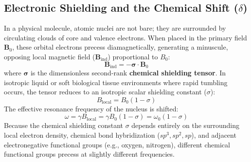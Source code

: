 \documentclass[11pt,a4paper]{article}
\begin{document}
\subsection{Electronic Shielding and the Chemical Shift (\texorpdfstring{$\delta$}{delta})}
In a physical molecule, atomic nuclei are not bare; they are surrounded by circulating clouds of core and valence electrons. When placed in the primary field $\mathbf{B}_0$, these orbital electrons precess diamagnetically, generating a minuscule, opposing local magnetic field ($\mathbf{B}_{\text{ind}}$) proportional to $B_0$:
\begin{equation}
    \mathbf{B}_{\text{ind}} = -\boldsymbol{\sigma} \cdot \mathbf{B}_0
\end{equation}
where $\boldsymbol{\sigma}$ is the dimensionless second-rank \textbf{chemical shielding tensor}. In isotropic liquid or soft biological tissue environments where rapid tumbling occurs, the tensor reduces to an isotropic scalar shielding constant ($\sigma$):
\begin{equation}
    B_{\text{local}} = B_0 (1 - \sigma)
\end{equation}
The effective resonance frequency of the nucleus is shifted:
\begin{equation}
    \omega = \gamma B_{\text{local}} = \gamma B_0 (1 - \sigma) = \omega_0 (1 - \sigma)
\end{equation}
Because the chemical shielding constant $\sigma$ depends entirely on the surrounding local electron density, chemical bond hybridization ($sp^3, sp^2, sp$), and adjacent electronegative functional groups (e.g., oxygen, nitrogen), different chemical functional groups precess at slightly different frequencies.
\end{document}
